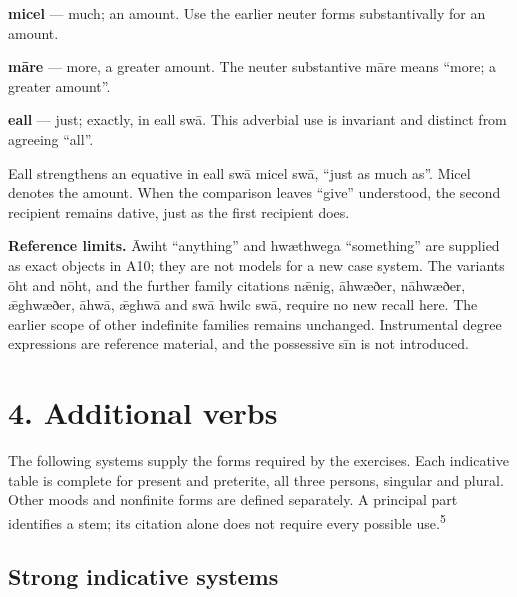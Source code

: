 \textbf{micel} — much; an amount. Use the earlier neuter forms substantivally for an amount.

\textbf{māre} — more, a greater amount. The neuter substantive māre means “more; a greater amount”.

\textbf{eall} — just; exactly, in eall swā. This adverbial use is invariant and distinct from agreeing “all”.

Eall strengthens an equative in eall swā micel swā, “just as much as”. Micel denotes the amount. When the comparison leaves “give” understood, the second recipient remains dative, just as the first recipient does.

\textbf{Reference limits.} Āwiht “anything” and hwæthwega “something” are supplied as exact objects in A10; they are not models for a new case system. The variants ōht and nōht, and the further family citations nǣnig, āhwæðer, nāhwæðer, ǣghwæðer, āhwā, ǣghwā and swā hwilc swā, require no new recall here. The earlier scope of other indefinite families remains unchanged. Instrumental degree expressions are reference material, and the possessive sīn is not introduced.

\section*{4. Additional verbs}

The following systems supply the forms required by the exercises. Each indicative table is complete for present and preterite, all three persons, singular and plural. Other moods and nonfinite forms are defined separately. A principal part identifies a stem; its citation alone does not require every possible use.\textsuperscript{5}

\subsection*{Strong indicative systems}

